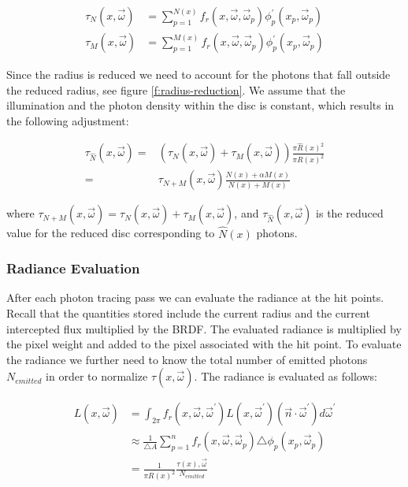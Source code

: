 \begin{equation}
\begin{aligned}
	\tau_N(x,\vec{\omega})&=\sum^{N(x)}_{p=1}f_r(x,\vec{\omega},\vec{\omega}_p)\phi^{'}_p(x_p,\vec{\omega}_p)\\
	\tau_M(x,\vec{\omega})&=\sum^{M(x)}_{p=1}f_r(x,\vec{\omega},\vec{\omega}_p)\phi^{'}_p(x_p,\vec{\omega}_p)
\end{aligned}
\end{equation}

Since the radius is reduced we need to account for the photons that fall outside the reduced radius, see figure \ref{f:radius-reduction}. We assume that the illumination and the photon density within the disc is constant, which results in the following adjustment:

\begin{equation}
	\begin{aligned}
		\tau_{\hat{N}}(x,\vec{\omega})=&(\tau_N(x,\vec{\omega})+\tau_M(x,\vec{\omega}))\frac{\pi \hat{R}(x)^{2}}{\pi R(x)^{2}}\\
		=&\tau_{N+M}(x,\vec{\omega})\frac{N(x)+\alpha M(x)}{N(x)+M(x)}
	\end{aligned}
\end{equation}

where $\tau_{N+M}(x,\vec{\omega})=\tau_{N}(x,\vec{\omega})+\tau_{M}(x,\vec{\omega})$, and $\tau_{\hat{N}}(x,\vec{\omega})$ is the reduced value for the reduced disc corresponding to $\hat{N}(x)$ photons.




\subsubsection{Radiance Evaluation}
After each photon tracing pass we can evaluate the radiance at the hit points. Recall that the quantities stored include the current radius and the current intercepted flux multiplied by the BRDF. The evaluated radiance is multiplied by the pixel weight and added to the pixel associated with the hit point. To evaluate the radiance we further need to know the total number of emitted photons $N_{emitted}$ in order to normalize $\tau (x,\vec{\omega})$. The radiance is evaluated as follows:

\begin{equation}
	\begin{aligned}
		L(x,\vec{\omega})&=\int_{2\pi}f_r(x,\vec{\omega},\vec{\omega}^{'})L(x,\vec{\omega}^{'})(\vec{n}\cdot\vec{\omega}^{'})d\vec{\omega}^{'}\\
		&\approx \frac{1}{\triangle A}\sum^{n}_{p=1}f_r(x,\vec{\omega},\vec{\omega}_p)\triangle\phi_p(x_p,\vec{\omega}_p)\\
		&=\frac{1}{\pi R(x)^{2}}\frac{\tau (x),\vec{\omega}}{N_{emitted}}
	\end{aligned}
\end{equation}

